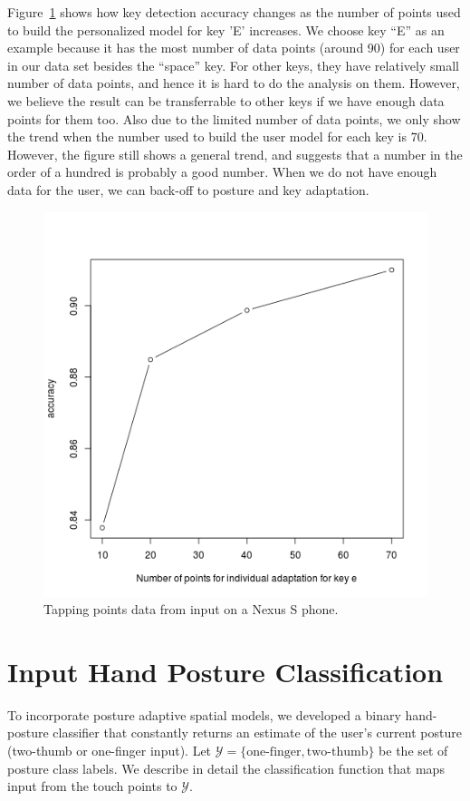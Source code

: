 \documentclass{sigchi}
\begin{document}
Figure~\ref{fig:user-adapt} shows how key detection accuracy changes as the number of points used to build
the personalized model for key 'E' increases. We choose key ``E'' as an
example because it has the most number of data points (around 90) for each
user in our data set besides the ``space'' key. For other keys, they have
relatively small number of data points, and hence it is hard to do the
analysis on them. However, we believe the result can be transferrable to other
keys if we have enough data points for them too. Also due to the limited number
of data points, we only show the trend when the number used to build the user
model for each key is 70.
However, the figure still shows a general trend, and suggests that a number in 
the order of a hundred is probably a good number. When we do not have enough 
data for the user, we can back-off to posture and key adaptation.

\begin{figure}[tb]
  \centering
  \includegraphics[width=0.9\columnwidth]{figures/user-adapt-e.png}
  \caption{Tapping points data from input on a Nexus S phone.}
  \label{fig:user-adapt}
\end{figure}

\section{Input Hand Posture Classification}\label{sec:posture-classification}
To incorporate posture adaptive spatial models, we developed a binary hand-posture classifier 
that constantly returns an estimate of the user's current posture (two-thumb or one-finger input).
Let $\mathcal{Y} = \{\text{one-finger}, \text{two-thumb}\}$ be the set of posture
class labels. We describe in detail the classification function that maps input from the
touch points to $\mathcal{Y}$.
\end{document}
